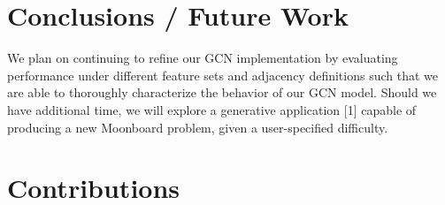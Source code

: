 \documentclass{article}
\begin{document}
\section{Conclusions / Future Work}
We plan on continuing to refine our GCN implementation by evaluating performance under different feature sets and adjacency definitions such that we are able to thoroughly characterize the behavior of our GCN model. Should we have additional time, we will explore a generative application [1] capable of producing a new Moonboard problem, given a user-specified difficulty.

\section{Contributions}



\end{document}
